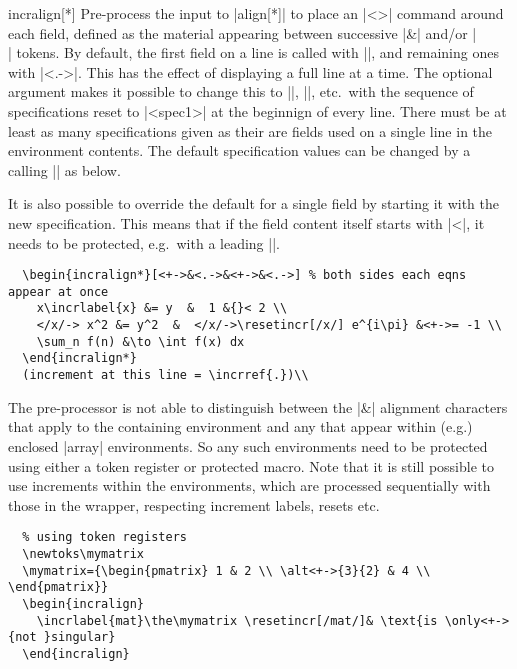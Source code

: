\documentclass[a4paper]{ltxdoc}
\begin{document}
\begin{environment}{{incralign[*]}}
    Pre-process the input to |align[*]| to place an |\onslide<>{}| command
    around each field, defined as the material appearing between successive |&|
    and/or |\\| tokens.  By default, the first field on a line is called with
    |\onslide<+->{}|, and remaining ones with ||.  This has the
    effect of displaying a full line at a time.  The optional argument makes it
    possible to change this to ||, ||, etc.\ with
    the sequence of specifications reset to |<spec1>| at the beginnign of every
    line. There must be at least as many specifications given as their are
    fields used on a single line in the environment contents.  The default
    specification values can be changed by a calling |\incraligndefaultspec| as
    below.

    It is also possible to override the default for a single field by starting
    it with the new specification.  This means that if the field content itself
    starts with |<|, it needs to be protected, e.g.\ with a leading |{}|.

    \example
\begin{verbatim}
  \begin{incralign*}[<+->&<.->&<+->&<.->] % both sides each eqns appear at once
    x\incrlabel{x} &= y  &  1 &{}< 2 \\
    </x/-> x^2 &= y^2  &  </x/->\resetincr[/x/] e^{i\pi} &<+->= -1 \\
    \sum_n f(n) &\to \int f(x) dx
  \end{incralign*}
  (increment at this line = \incrref{.})\\
\end{verbatim}
    
    The pre-processor is not able to distinguish between the |&| alignment
    characters that apply to the containing environment and any that appear
    within (e.g.) enclosed |array| environments.  So any such environments need
    to be protected using either a token register or protected macro.  Note that
    it is still possible to use increments within the environments, which are
    processed sequentially with those in the wrapper, respecting increment
    labels, resets etc.

    \example
\begin{verbatim}
  % using token registers
  \newtoks\mymatrix
  \mymatrix={\begin{pmatrix} 1 & 2 \\ \alt<+->{3}{2} & 4 \\ \end{pmatrix}}
  \begin{incralign}
    \incrlabel{mat}\the\mymatrix \resetincr[/mat/]& \text{is \only<+->{not }singular}
  \end{incralign}


\end{verbatim}
\end{environment}
\end{document}
